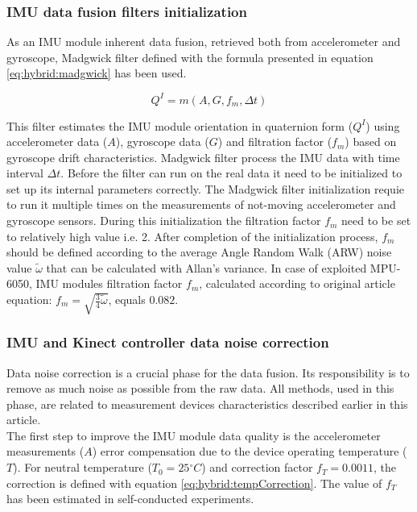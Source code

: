 \documentclass[sensors,article,submit,moreauthors,pdftex,10pt,a4paper]{mdpi}
\newcommand{\degree}{\ensuremath{{}^{\circ}}\xspace}
\begin{document}
	\subsubsection{IMU data fusion filters initialization}
	As an IMU module inherent data fusion, retrieved both from accelerometer and gyroscope, Madgwick filter \cite{Madgwick2011} defined with the formula presented in equation \ref{eq:hybrid:madgwick} has been used. 
	
	\begin{equation}
		Q^I=m(A,G,f_m,\Delta t)
		\label{eq:hybrid:madgwick}
	\end{equation}
	
	This filter estimates the IMU module orientation in quaternion form ($Q^I$) using accelerometer data ($A$), gyroscope data ($G$) and filtration factor ($f_m$) based on gyroscope drift characteristics. Madgwick filter process the IMU data with time interval $\Delta t$. Before the filter can run on the real data it need to be initialized to set up its internal parameters correctly. The Madgwick filter initialization requie to run it multiple times on the measurements of not-moving accelerometer and gyroscope sensors. During this initialization the filtration factor $f_m$ need to be set to relatively high value i.e. 2. After completion of the initialization process, $f_m$ should be defined according to the average Angle Random Walk (ARW) noise value $\widetilde{\omega}$ that can be calculated with Allan’s variance\cite{FreescaleSemiconductor2015,Allan1966,Allan1987}. In case of exploited MPU-6050, IMU modules filtration factor $f_m$, calculated according to original article\cite{Madgwick2011} equation: $f_m = \sqrt{\frac{3}{4}\widetilde{\omega}}$, equals $0.082$. 
	
	\subsubsection{IMU and Kinect controller data noise correction}
	Data noise correction is a crucial phase for the data fusion. Its responsibility is to remove as much noise as possible from the raw data. All methods, used in this phase, are related to measurement devices characteristics described earlier in this article.\\
	The first step to improve the IMU module data quality is the accelerometer measurements ($A$) error compensation due to the device operating temperature ($T$). For neutral temperature ($T_0=25\degree C$) and correction factor $f_T= 0.0011$, the correction is defined with equation \ref{eq:hybrid:tempCorrection}. The value of $f_T$ has been estimated in self-conducted experiments.
	
\end{document}

